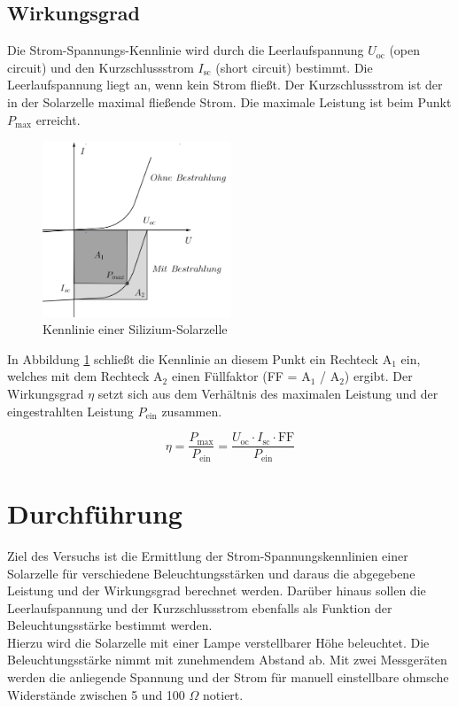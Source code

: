 \subsection{Wirkungsgrad}
Die Strom-Spannungs-Kennlinie wird durch die Leerlaufspannung $U_{\text{oc}}$ (open circuit) und den Kurzschlussstrom $I_{\text{sc}}$
(short circuit) bestimmt. Die Leerlaufspannung liegt an, wenn kein Strom fließt. Der Kurzschlussstrom ist der in der Solarzelle maximal
fließende Strom. Die maximale Leistung ist beim Punkt $P_{\text{max}}$ erreicht. 

\begin{figure}[h]
\includegraphics[width=0.5\textwidth]{pics/sol2.png}
\caption{Kennlinie einer Silizium-Solarzelle}
\label{Kennlinie}
\end{figure}

In Abbildung \ref{Kennlinie} schließt die Kennlinie an
diesem Punkt ein Rechteck A$_1$ ein, welches mit dem Rechteck A$_2$ einen Füllfaktor (FF = A$_1$ / A$_2$) ergibt. Der Wirkungsgrad $\eta$
setzt sich aus dem Verhältnis des maximalen Leistung und der eingestrahlten Leistung $P_{\text{ein}}$ zusammen.

\begin{equation}
 \eta = \frac{P_{\text{max}}}{P_{\text{ein}}} = \frac{U_{\text{oc}}\cdot I_{\text{sc}}\cdot \text{FF}}{P_{\text{ein}}}
\end{equation}

\section{Durchführung}
Ziel des Versuchs ist die Ermittlung der Strom-Spannungskennlinien einer Solarzelle für verschiedene Beleuchtungsstärken und daraus
die abgegebene Leistung und der Wirkungsgrad berechnet werden. Darüber hinaus sollen die Leerlaufspannung und der Kurzschlussstrom 
ebenfalls als Funktion der Beleuchtungsstärke bestimmt werden.\\
Hierzu wird die Solarzelle mit einer Lampe verstellbarer Höhe beleuchtet. Die Beleuchtungsstärke nimmt mit zunehmendem Abstand ab. 
Mit zwei Messgeräten werden die anliegende Spannung und der Strom für manuell einstellbare ohmsche Widerstände zwischen 5 und 100 $\Omega$
notiert. 

